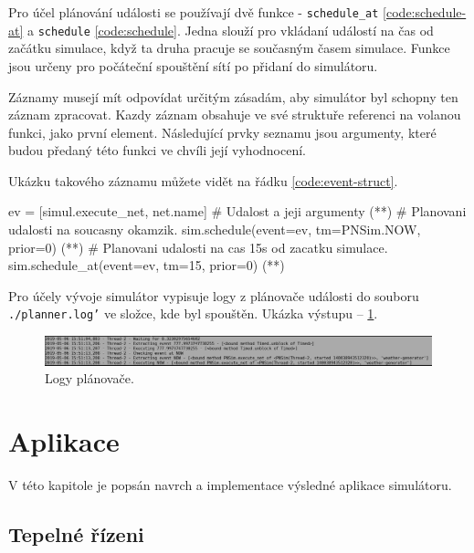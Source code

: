 Pro účel plánování události se používají dvě funkce - \texttt{schedule\_at} \ref{code:schedule-at} a \texttt{schedule} \ref{code:schedule}. Jedna slouží pro vkládaní událostí na čas od začátku simulace, když ta druha pracuje se současným časem simulace. Funkce jsou určeny pro počáteční spouštění sítí po přidaní do simulátoru.

Záznamy musejí mít odpovídat určitým zásadám, aby simulátor byl schopny ten záznam zpracovat. Kazdy záznam obsahuje ve své struktuře referenci na volanou funkci, jako první element. Následující prvky seznamu jsou argumenty, které budou předaný této funkci ve chvíli její vyhodnocení.

Ukázku takového záznamu můžete vidět na řádku \ref{code:event-struct}.

\begin{python}
  ev = [simul.execute_net, net.name] # Udalost a jeji argumenty (*\label{code:event-struct}*)
  # Planovani udalosti na soucasny okamzik.
  sim.schedule(event=ev, tm=PNSim.NOW, prior=0) (*\label{code:schedule}*)
  # Planovani udalosti na cas 15s od zacatku simulace.
  sim.schedule_at(event=ev, tm=15, prior=0) (*\label{code:schedule-at}*)
\end{python}

Pro účely vývoje simulátor vypisuje logy z plánovače události do souboru \texttt{./planner.log'} ve složce, kde byl spouštěn. Ukázka výstupu -- \ref{log-viz}.

\begin{center}
  \begin{figure}[htb]
    \includegraphics[width=\textwidth]{obrazky-figures/logs.png}
    \caption{Logy plánovače.}
    \label{log-viz}
  \end{figure}
\end{center}


\chapter{Aplikace}

V této kapitole je popsán navrch a implementace výsledné aplikace simulátoru.

\section{Tepelné řízeni}
\label{sec:tepelne-rizeni}

